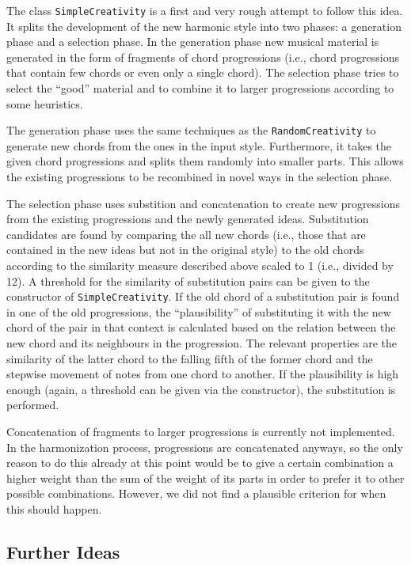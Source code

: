 The class \texttt{SimpleCreativity} is a first and very rough attempt to follow this idea.
It splits the development of the new harmonic style into two phases: a generation phase and a selection phase.
In the generation phase new musical material is generated in the form of fragments of chord progressions (i.e., chord progressions that contain few chords or even only a single chord).
The selection phase tries to select the ``good'' material and to combine it to larger progressions according to some heuristics.

The generation phase uses the same techniques as the \texttt{RandomCreativity} to generate new chords from the ones in the input style.
Furthermore, it takes the given chord progressions and splits them randomly into smaller parts.
This allows the existing progressions to be recombined in novel ways in the selection phase.

The selection phase uses substition and concatenation to create new progressions from the existing progressions and the newly generated ideas.
Substitution candidates are found by comparing the all new chords (i.e., those that are contained in the new ideas but not in the original style) to the old chords according to the similarity measure described above scaled to 1 (i.e., divided by 12).
A threshold for the similarity of substitution pairs can be given to the constructor of \texttt{SimpleCreativity}.
If the old chord of a substitution pair is found in one of the old progressions, the ``plausibility'' of substituting it with the new chord of the pair in that context is calculated based on the relation between the new chord and its neighbours in the progression.
The relevant properties are the similarity of the latter chord to the falling fifth of the former chord and the stepwise movement of notes from one chord to another.
If the plausibility is high enough (again, a threshold can be given via the constructor), the substitution is performed.

Concatenation of fragments to larger progressions is currently not implemented.
In the harmonization process, progressions are concatenated anyways, so the only reason to do this already at this point would be to give a certain combination a higher weight than the sum of the weight of its parts in order to prefer it to other possible combinations.
However, we did not find a plausible criterion for when this should happen.

\subsection{Further Ideas}

